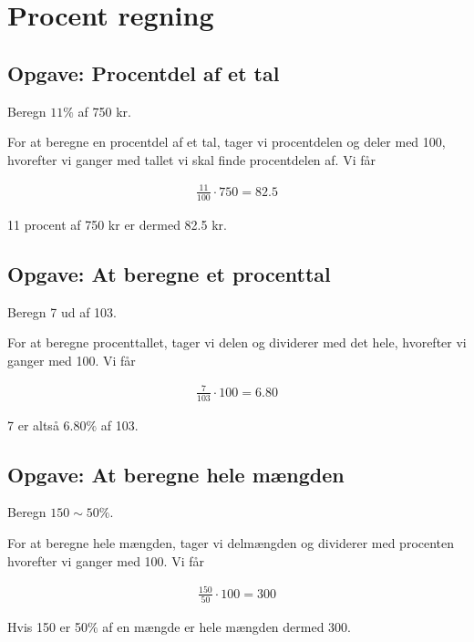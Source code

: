 \section{Procent regning}

\subsection{Opgave: Procentdel af et tal}
Beregn $11\%$ af 750 kr.

For at beregne en procentdel af et tal, tager vi procentdelen og deler med 100, hvorefter vi ganger med tallet vi skal finde procentdelen af. Vi får

\begin{align*}
\frac{11}{100}\cdot 750 = 82.5
\end{align*}

11 procent af 750 kr er dermed 82.5 kr.

\subsection{Opgave: At beregne et procenttal}
Beregn 7 ud af 103.

For at beregne procenttallet, tager vi delen og dividerer med det hele, hvorefter vi ganger med 100. Vi får

\begin{align*}
\frac{7}{103}\cdot 100 = 6.80
\end{align*}

7 er altså 6.80$\%$ af 103.

\subsection{Opgave: At beregne hele mængden}
Beregn $150 \sim 50\%$.

For at beregne hele mængden, tager vi delmængden og dividerer med procenten hvorefter vi ganger med 100. Vi får

\begin{align*}
\frac{150}{50}\cdot 100 = 300
\end{align*}

Hvis 150 er 50$\%$ af en mængde er hele mængden dermed 300.


